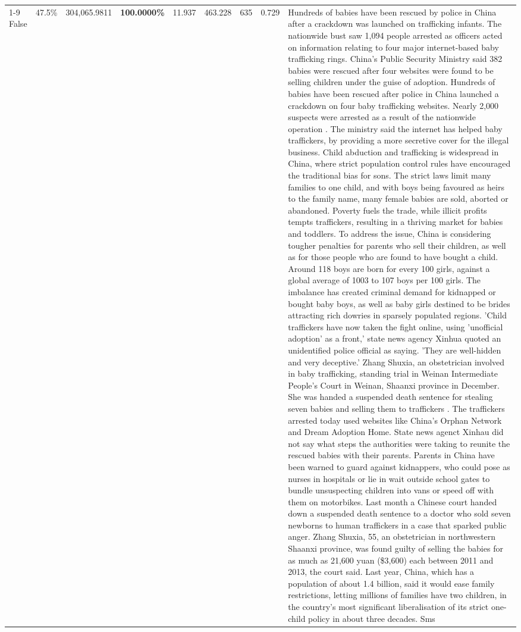 \begin{table}[H]
\begin{tabular}{lllrlllll}
\cline{1-9}
False & 47.5\% & 304,065.9811 & \bfseries \color{red} 100.0000\% & 11.937 & 463.228 & 635 & 0.729 & Hundreds of babies have been rescued by police in China after a crackdown was launched on trafficking infants. The nationwide bust saw 1,094 people arrested as officers acted on information relating to four major internet-based baby trafficking rings. China's Public Security Ministry said 382 babies were rescued after four websites were found to be selling children under the guise of adoption. Hundreds of babies have been rescued after police in China launched a crackdown on four baby trafficking websites. Nearly 2,000 suspects were arrested as a result of the nationwide operation . The ministry said the internet has helped baby traffickers, by providing a more secretive cover for the illegal business. Child abduction and trafficking is widespread in China, where strict population control rules have encouraged the traditional bias for sons. The strict laws limit many families to one child, and with boys being favoured as heirs to the family name, many female babies are sold, aborted or abandoned. Poverty fuels the trade, while illicit profits tempts traffickers, resulting in a thriving market for babies and toddlers. To address the issue, China is considering tougher penalties for parents who sell their children, as well as for those people who are found to have bought a child. Around 118 boys are born for every 100 girls, against a global average of 1003 to 107 boys per 100 girls. The imbalance has created criminal demand for kidnapped or bought baby boys, as well as baby girls destined to be brides attracting rich dowries in sparsely populated regions. 'Child traffickers have now taken the fight online, using 'unofficial adoption' as a front,' state news agency Xinhua quoted an unidentified police official as saying. 'They are well-hidden and very deceptive.' Zhang Shuxia, an obstetrician involved in baby trafficking, standing trial in Weinan Intermediate People's Court in Weinan, Shaanxi province in December. She was handed a suspended death sentence for stealing seven babies and selling them to traffickers . The traffickers arrested today used websites like China's Orphan Network and Dream Adoption Home. State news agenct Xinhau did not say what steps the authorities were taking to reunite the rescued babies with their parents. Parents in China have been warned to guard against kidnappers, who could pose as nurses in hospitals or lie in wait outside school gates to bundle unsuspecting children into vans or speed off with them on motorbikes. Last month a Chinese court handed down a suspended death sentence to a doctor who sold seven newborns to human traffickers in a case that sparked public anger. Zhang Shuxia, 55, an obstetrician in northwestern Shaanxi province, was found guilty of selling the babies for as much as 21,600 yuan (\$3,600) each between 2011 and 2013, the court said. Last year, China, which has a population of about 1.4 billion, said it would ease family restrictions, letting millions of families have two children, in the country's most significant liberalisation of its strict one-child policy in about three decades. Sms \\

\end{tabular}
\end{table}
